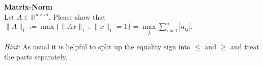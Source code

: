 \textbf{Matrix-Norm}\\
Let $A\in\mathbb{R}^{n\times m}$.
Please show that
$\| A \|_1 := \max \lbrace \| Ax \|_1 \,\colon\, \|x\|_1 = 1 \rbrace = \max\limits_{j} \sum_{i=1}^{n} |a_{ij}|.$

\textit{Hint: }As usual it is helpful to split up the equality sign into $\leq$ and $\geq$ and treat the parts separately. 